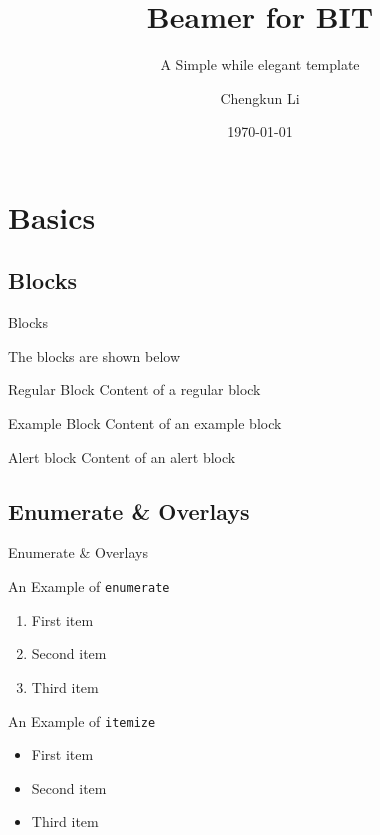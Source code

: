 \documentclass[
10pt,
aspectratio=169,
]{beamer}
\title{Beamer for BIT}
\subtitle{A Simple while elegant template}
\author[C.Li]{Chengkun Li}
\institute[Beijing Institute of Technology]{School of Automation\\
Beijing Institute of Technology}
\date{\today}
\begin{document}
\maketitle



\section{Basics}
\subsection{Blocks}
\begin{frame}[c]{Blocks}
	
The blocks are shown below
\begin{block}{Regular Block}
	Content of a regular block
\end{block}

\begin{exampleblock}{Example Block}
	Content of an example block
\end{exampleblock}

\begin{alertblock}{Alert block}
	Content of an alert block
\end{alertblock}

\end{frame}	

\subsection{Enumerate \& Overlays}

\begin{frame}[c]{Enumerate \& Overlays}
	
{\large An Example of \texttt{enumerate}}
	\begin{enumerate}[<+->]
		\item First item
		\item Second item
		\item Third item
	\end{enumerate}
\vfill
{\large An Example of \texttt{itemize}}	
	\begin{itemize}[<+->]
	\item First item
	\item Second item
	\item Third item
	\end{itemize}
\end{frame}	
\end{document}
